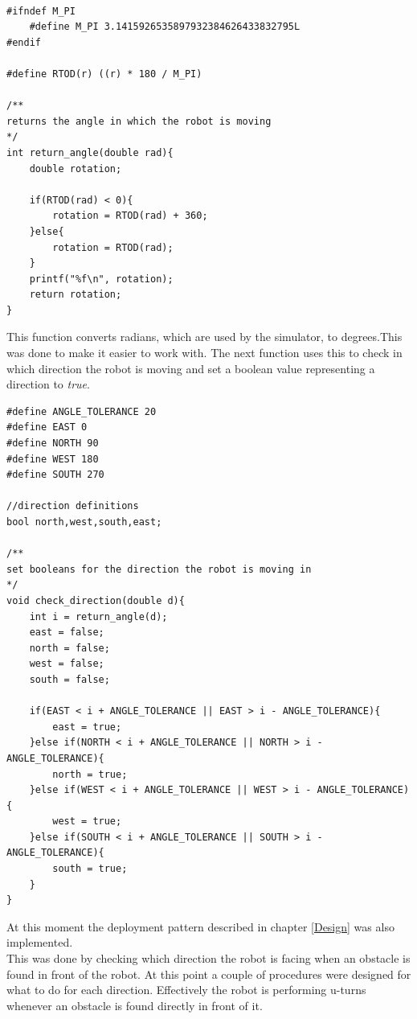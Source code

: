\begin{lstlisting}[caption={Converting Radians to degrees}]

#ifndef M_PI
    #define M_PI 3.1415926535897932384626433832795L
#endif

#define RTOD(r) ((r) * 180 / M_PI)

/**
returns the angle in which the robot is moving
*/
int return_angle(double rad){
    double rotation;

    if(RTOD(rad) < 0){
        rotation = RTOD(rad) + 360;
    }else{
        rotation = RTOD(rad);
    }
    printf("%f\n", rotation);
    return rotation;
}
\end{lstlisting}

This function converts radians, which are used by the simulator, to degrees.This was done to make it easier to work with.
The next function uses this to check in which direction the robot is moving and set a boolean value representing a direction to \textit{true}.

\begin{lstlisting}[caption={Early check of the movement direction}]
#define ANGLE_TOLERANCE 20
#define EAST 0
#define NORTH 90
#define WEST 180
#define SOUTH 270

//direction definitions
bool north,west,south,east;

/**
set booleans for the direction the robot is moving in
*/
void check_direction(double d){
    int i = return_angle(d);
    east = false;
    north = false;
    west = false;
    south = false;

    if(EAST < i + ANGLE_TOLERANCE || EAST > i - ANGLE_TOLERANCE){
        east = true;
    }else if(NORTH < i + ANGLE_TOLERANCE || NORTH > i - ANGLE_TOLERANCE){
        north = true;
    }else if(WEST < i + ANGLE_TOLERANCE || WEST > i - ANGLE_TOLERANCE){
        west = true;
    }else if(SOUTH < i + ANGLE_TOLERANCE || SOUTH > i - ANGLE_TOLERANCE){
        south = true;
    }
}
\end{lstlisting}

At this moment the deployment pattern described in chapter \ref{Design}  was also implemented. \\
This was done by checking which direction the robot is facing when an obstacle is found in front of the robot. At this point a couple of procedures were designed for what to do for each direction. Effectively the robot is performing u-turns whenever an obstacle is found directly in front of it.

